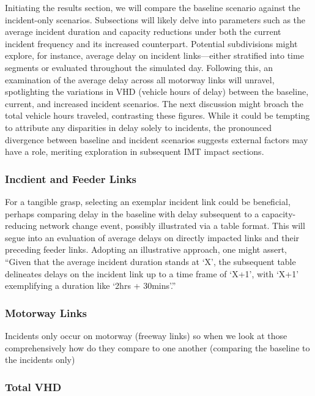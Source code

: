 \documentclass[
  letterpaper,
  authoryear]{elsarticle}
\begin{document}
Initiating the results section, we will compare the baseline scenario
against the incident-only scenarios. Subsections will likely delve into
parameters such as the average incident duration and capacity reductions
under both the current incident frequency and its increased counterpart.
Potential subdivisions might explore, for instance, average delay on
incident links---either stratified into time segments or evaluated
throughout the simulated day. Following this, an examination of the
average delay across all motorway links will unravel, spotlighting the
variations in VHD (vehicle hours of delay) between the baseline,
current, and increased incident scenarios. The next discussion might
broach the total vehicle hours traveled, contrasting these figures.
While it could be tempting to attribute any disparities in delay solely
to incidents, the pronounced divergence between baseline and incident
scenarios suggests external factors may have a role, meriting
exploration in subsequent IMT impact sections.

\hypertarget{incdient-and-feeder-links}{%
\subsubsection{Incdient and Feeder
Links}\label{incdient-and-feeder-links}}

For a tangible grasp, selecting an exemplar incident link could be
beneficial, perhaps comparing delay in the baseline with delay
subsequent to a capacity-reducing network change event, possibly
illustrated via a table format. This will segue into an evaluation of
average delays on directly impacted links and their preceding feeder
links. Adopting an illustrative approach, one might assert, ``Given that
the average incident duration stands at `X', the subsequent table
delineates delays on the incident link up to a time frame of `X+1', with
`X+1' exemplifying a duration like `2hrs + 30mins'.''

\hypertarget{motorway-links}{%
\subsubsection{Motorway Links}\label{motorway-links}}

Incidents only occur on motorway (freeway links) so when we look at
those comprehensively how do they compare to one another (comparing the
baseline to the incidents only)

\hypertarget{total-vhd}{%
\subsubsection{Total VHD}\label{total-vhd}}
\end{document}
